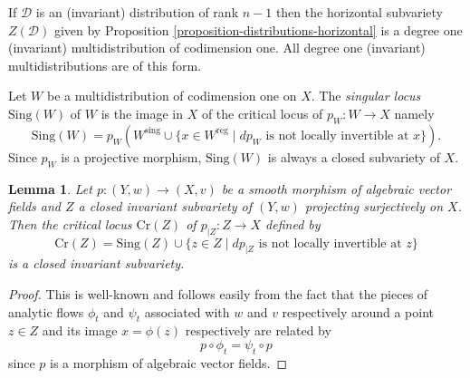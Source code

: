 \documentclass[12pt]{amsart}
\theoremstyle{definition}
\theoremstyle{plain}
\newtheorem{lemma}[definition]{Lemma}
\theoremstyle{exampstyle}
\theoremstyle{exampstyle}\newtheorem{thmxbis}{Theorem}
\numberwithin{equation}{section}
\theoremstyle{remark}
\begin{document}
{\example \label{example-degreeone} If $\mathcal D$ is an (invariant) distribution of rank $n - 1$ then the  horizontal subvariety $Z(\mathcal D)$ given by Proposition \ref{proposition-distributions-horizontal} is a degree one (invariant) multidistribution of codimension one. All degree one (invariant) multidistributions are of this form.}


{ Let $W$ be a multidistribution of codimension one on $X$. The {\em singular locus} $\mathrm{Sing}(W)$ of $W$ is the image in $X$ of the critical locus of 
$p_W: W \rightarrow X$
namely 
$$\mathrm{Sing}(W) = p_W(W^{\mathrm{sing}} \cup \lbrace x \in W^{\mathrm{reg}} \mid dp_W \text{ is not locally invertible at } x\rbrace).$$
Since $p_W$ is a projective morphism, $\mathrm{Sing}(W)$ is always a closed subvariety of $X$.}


\begin{lemma} \label{lemma-criticalocus invariant}
Let $p: (Y,w) \rightarrow (X,v)$ be a smooth morphism of algebraic vector fields and $Z$ a closed invariant subvariety of $(Y,w)$ projecting surjectively on $X$. Then the critical locus $\mathrm{Cr}(Z)$ of $p_{\mid Z}: Z \rightarrow X$ defined by 
$$\mathrm{Cr}(Z) = \mathrm{Sing}(Z) \cup \lbrace z \in Z \mid dp_{\mid Z} \text{ is not locally invertible  at } z  \rbrace$$
 is a closed invariant subvariety.   
\end{lemma} 


\begin{proof}
This is well-known and follows easily from the fact that the pieces of analytic flows $\phi_t$ and $\psi_t$ associated with $w$ and $v$ respectively around a point $z \in Z$ and its image $x = \phi(z)$ respectively are related by $$p \circ \phi_t = \psi_t \circ p$$
since $p$ is a morphism of algebraic vector fields.
\end{proof} 
%
%
\end{document}
